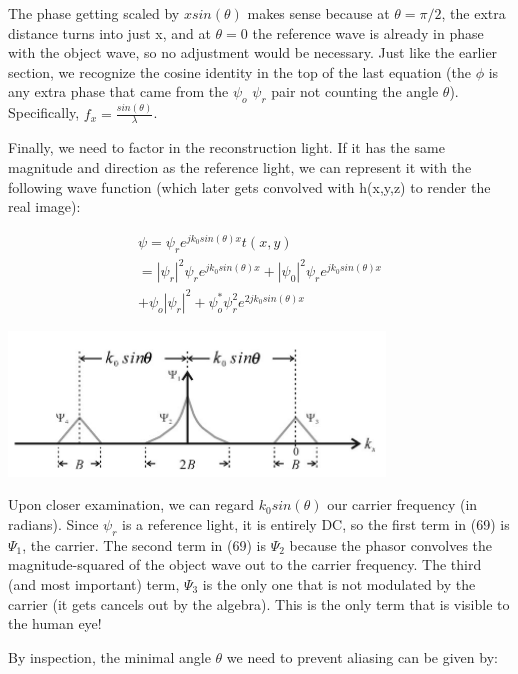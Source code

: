 \documentclass[12pt]{article}
\begin{document}
The phase getting scaled by \(xsin(\theta)\) makes sense because at \(\theta = \pi/2\), the extra distance turns into just x, and at \(\theta = 0\)
the reference wave is already in phase with the object wave, so no adjustment would be necessary. Just like the earlier section,
we recognize the cosine identity in the top of the last equation (the \(\phi\) is any extra phase that came from the \(\psi_{o}\) \(\psi_{r}\) pair not counting
the angle \(\theta\)). Specifically, \(f_{x} = \frac{sin(\theta)}{\lambda}\).

Finally, we need to factor in the reconstruction light. If it has the same magnitude and direction
as the reference light, we can represent it with the following wave function (which
later gets convolved with h(x,y,z) to render the real image):

\begin{equation}
	\begin{multlined}
	\psi = \psi_{r}e^{jk_{0}sin(\theta)x}t(x,y)
	\\=|\psi_{r}|^2\psi_{r}e^{jk_{0}sin(\theta)x} + |\psi_{0}|^2\psi_{r}e^{jk_{0}sin(\theta)x}
	\\+ \psi_{o}|\psi_{r}|^2 + \psi_{o}^*\psi_{r}^2e^{2jk_{0}sin(\theta)x}
	\end{multlined}
\end{equation}

\begin{center}
\includegraphics[width=100mm]{tupac14.png}
\end{center}

Upon closer examination, we can regard \(k_{0}sin(\theta)\) our carrier frequency (in radians). Since \(\psi_{r}\) is a reference light, it is entirely DC, so the first term
in (69) is \(\Psi_{1}\), the carrier.
The second term in (69) is \(\Psi_{2}\) because the phasor convolves the magnitude-squared of the object wave out to the carrier frequency.
The third (and most important) term, \(\Psi_{3}\) is the only one that is not modulated by the carrier (it gets cancels out by the algebra).
This is the only term that is visible to the human eye!

By inspection, the minimal angle \(\theta\) we need to prevent aliasing can be given by:
\end{document}

